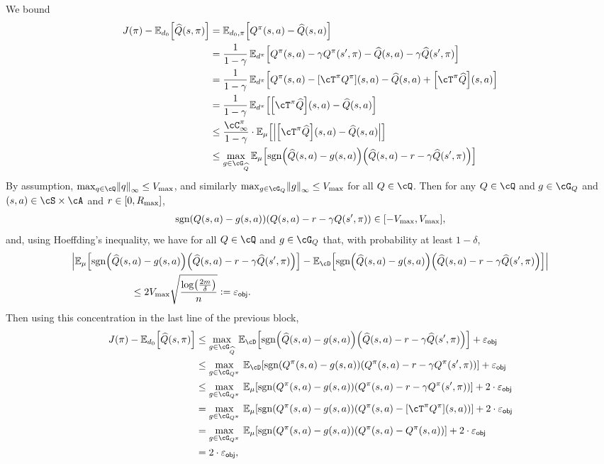We bound
\begin{align}
  J(\pi) - \En_{d_{0}}\sbr*{\Qhat(s,\pi)}  
  & = \En_{d_{0},\pi}\sbr*{\Qpi(s,a) - \Qhat(s,a)}
  \\
  & = \frac{1}{1-\gamma} \En_{d^\pi}\sbr*{\Qpi(s,a) - \gamma \Qpi(s',\pi) - \Qhat(s,a) - \gamma\Qhat(s',\pi)}
  \\
  & = \frac{1}{1-\gamma} \En_{d^\pi}\sbr*{\Qpi(s,a)-\sbr*{\Tpi\Qpi}(s,a)-\Qhat(s,a) + \sbr*{\Tpi\Qhat}(s,a)}
  \\
  & =  \frac{1}{1-\gamma} \En_{d^\pi}\sbr*{\sbr*{\Tpi\Qhat}(s,a) - \Qhat(s,a)}
  \\
  & \le \frac{\Cinf}{1-\gamma} \cdot \En_{\data}\sbr*{\abr*{\sbr*{\Tpi\Qhat}(s,a) - \Qhat(s,a)}} 
  \\
  & \le \max_{g\in\cG_{\Qhat}} \En_{\data}\sbr*{\sgn\rbr*{\Qhat(s,a) - g(s,a)}\rbr*{\Qhat(s,a) - r - \gamma\Qhat(s',\pi)}}
\end{align}
By assumption, 
$\max_{q\in\cQ} \nbr*{q}_\infty \le \Vmax$,
and similarly $\max_{g\in\cG_Q} \nbr*{g}_\infty \le \Vmax$ for all $Q \in \cQ$.
Then for any $Q\in\cQ$ and $g \in \cG_Q$ 
and $(s,a)\in \cS\times\cA$ and $r \in [0, R_{\max}]$,
\begin{align}
  {\sgn\rbr*{Q(s,a)-g(s,a)}\rbr*{Q(s,a) - r - \gamma Q(s',\pi)}} \in \sbr*{-\Vmax, \Vmax}, 
\end{align}
and, using Hoeffding's inequality, 
we have  for all $Q \in \cQ$ and $g \in \cG_Q$ that, 
with probability at least $1-\delta$,
\begin{align}
  &\abr*{ \En_{\data}\sbr*{\sgn\rbr*{\Qhat(s,a) - g(s,a)}\rbr*{\Qhat(s,a) - r - \gamma\Qhat(s',\pi)}} 
  -  \En_{\cD}\sbr*{\sgn\rbr*{\Qhat(s,a) - g(s,a)}\rbr*{\Qhat(s,a) - r - \gamma\Qhat(s',\pi)}}}
  \\
  &\qquad\qquad\qquad \le 2\Vmax\sqrt{\frac{\log\rbr*{\frac{2m}{\delta}}}{n}}
  \ldef{} \vepsobj.
\end{align}
Then using this concentration in the last line of the previous block, 
\begin{align}
  J(\pi) - \En_{d_{0}}\sbr*{\Qhat(s,\pi)}  
  & \le  \max_{g\in\cG_{\Qhat}}{}\En_{\cD}\sbr*{\sgn\rbr*{\Qhat(s,a) - g(s,a)}\rbr*{\Qhat(s,a) - r - \gamma\Qhat(s',\pi)}}
  + \vepsobj
  \\
  & \le  \max_{g\in\cG_{\Qpi}}{}\En_{\cD}\sbr*{\sgn\rbr*{\Qpi(s,a) - g(s,a)}\rbr*{\Qpi(s,a) - r - \gamma\Qpi(s',\pi)}}
  + \vepsobj
  \\
  & \le  \max_{g\in\cG_{\Qpi}}{}\En_{\data}\sbr*{\sgn\rbr*{\Qpi(s,a) - g(s,a)}\rbr*{\Qpi(s,a) - r - \gamma\Qpi(s',\pi)}}
  + 2\cdot\vepsobj
  \\
  & =  \max_{g\in\cG_{\Qpi}}{}\En_{\data}\sbr*{\sgn\rbr*{\Qpi(s,a) - g(s,a)}\rbr*{\Qpi(s,a) - \sbr*{\Tpi \Qpi}(s,a)}}
  + 2\cdot\vepsobj
  \\
  & =  \max_{g\in\cG_{\Qpi}}{}\En_{\data}\sbr*{\sgn\rbr*{\Qpi(s,a) - g(s,a)}\rbr*{\Qpi(s,a) - \Qpi(s,a)}}
  + 2\cdot\vepsobj
  \\
  & = 2\cdot\vepsobj,  
\end{align}
